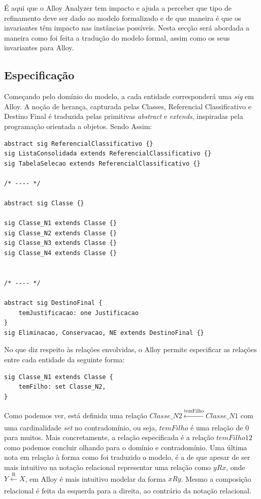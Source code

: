 \documentclass[tikz,runningheads,a4paper]{llncs}
\begin{document}
É aqui que o Alloy Analyzer tem impacto e ajuda a perceber que tipo de refinamento deve ser dado ao modelo formalizado e de que maneira é que os invariantes têm impacto nas instâncias possíveis. Nesta secção será abordada a maneira como foi feita a tradução do modelo formal, assim como os seus invariantes para Alloy.

\subsection{Especificação}

Começando pelo domínio do modelo, a cada entidade corresponderá uma \textit{sig} em Alloy. A noção de herança, capturada pelas Classes, Referencial Classificativo e Destino Final é traduzida pelas primitivas \textit{abstract} e \textit{extends}, inspiradas pela programação orientada a objetos. Sendo Assim:

\begin{lstlisting}[language=alloy, frame=single]
abstract sig ReferencialClassificativo {}
sig ListaConsolidada extends ReferencialClassificativo {}
sig TabelaSelecao extends ReferencialClassificativo {}

/* ---- */

abstract sig Classe {}

sig Classe_N1 extends Classe {}
sig Classe_N2 extends Classe {}
sig Classe_N3 extends Classe {}
sig Classe_N4 extends Classe {}


/* ---- */

abstract sig DestinoFinal {
    temJustificacao: one Justificacao
}
sig Eliminacao, Conservacao, NE extends DestinoFinal {}
\end{lstlisting}{}

No que diz respeito às relações envolvidas, o Alloy permite especificar as relações entre cada entidade da seguinte forma:

\begin{lstlisting}[language=alloy, frame=single]
sig Classe_N1 extends Classe {
    temFilho: set Classe_N2,
}
\end{lstlisting}{}

Como podemos ver, está definida uma relação $Classe\_N2 \xleftarrow[]{\text{temFilho}} Classe\_N1$ com uma cardinalidade \textit{set} no contradomínio, ou seja, $temFilho$ é uma relação de 0 para muitos. Mais concretamente, a relação especificada é a relação $temFilho12$ como podemos concluir olhando para o domínio e contradomínio. Uma última nota em relação à forma como foi traduzido o modelo, é a de que apesar de ser mais intuitivo na notação relacional representar uma relação como $y R x$, onde $Y \xleftarrow[]{\text{R}} X$, em Alloy é mais intuitivo modelar da forma $x R y$. Mesmo a composição relacional é feita da esquerda para a direita, ao contrário da notação relacional.
\end{document}
